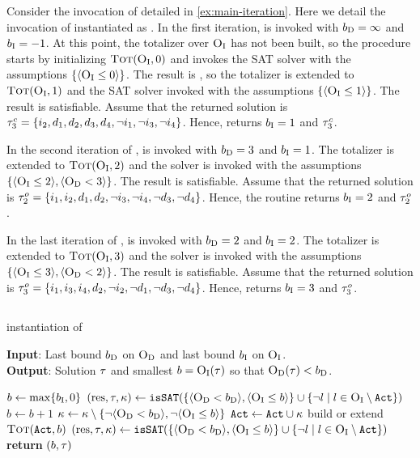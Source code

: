 \begin{example}
  Consider the invocation of \algname{} detailed in \cref{ex:main-iteration}. 
  Here we detail the invocation of \Min{} instantiated as \unsatsat{}.
  In the first iteration, \unsatsat{} is invoked with $b_{\text{D}} = \infty$ and $b_{\text{I}}=-1$.
  At this point, the totalizer over $\textsc{O}_{\text{I}}$ has not been built, so the procedure starts by initializing $\textsc{Tot}(\textsc{O}_{\text{I}}, 0)$ and invokes the SAT solver with the assumptions $\{\langle \textsc{O}_{\text{I}} \leq 0 \rangle\}$.
  The result is \unsat{}, so the totalizer is extended to $\textsc{Tot}(\textsc{O}_{\text{I}}, 1)$ and the SAT solver invoked with the assumptions $\{ \langle \textsc{O}_{\text{I}} \leq 1 \rangle\}$.
  The result is satisfiable.
  Assume that the returned solution is $\tau^c_3 = \{i_2,\allowbreak d_1,\allowbreak d_2,\allowbreak d_3,\allowbreak d_4,\allowbreak \lnot i_1,\allowbreak \lnot i_3,\allowbreak \lnot i_4\}$.
  Hence, \unsatsat{} returns $b_{\text{I}} = 1$ and $\tau^c_3$.

  In the second iteration of \algname{}, \unsatsat{} is invoked with $b_{\text{D}} = 3$ and $b_{\text{I}} = 1$.
  The totalizer is extended to $\textsc{Tot}(\textsc{O}_{\text{I}}, 2)$ and the solver is invoked with the assumptions $\{\langle \textsc{O}_{\text{I}} \leq 2 \rangle, \langle \textsc{O}_{\text{D}} < 3 \rangle\}$.
  The result is satisfiable.
  Assume that the returned solution is $\tau^o_2 = \{i_1,\allowbreak i_2,\allowbreak d_1,\allowbreak d_2,\allowbreak \lnot i_3,\allowbreak \lnot i_4,\allowbreak \lnot d_3,\allowbreak \lnot d_4\}$.
  Hence, the routine returns $b_{\text{I}} = 2$ and $\tau^o_2$.
  
  In the last iteration of \algname{}, \unsatsat{} is invoked with $b_{\text{D}} = 2$ and $b_{\text{I}} = 2$.
  The totalizer is extended to $\textsc{Tot}(\textsc{O}_{\text{I}}, 3)$ and the solver is invoked with the assumptions $\{\langle \textsc{O}_{\text{I}} \leq 3 \rangle, \langle \textsc{O}_{\text{D}} < 2 \rangle\}$.
  The result is satisfiable.
  Assume that the returned solution is $\tau^o_3 = \{i_1,\allowbreak i_3,\allowbreak i_4,\allowbreak d_2,\allowbreak \lnot i_2,\allowbreak \lnot d_1,\allowbreak \lnot d_3,\allowbreak \lnot d_4\}$.
  Hence, \unsatsat{} returns $b_{\text{I}} = 3$ and $\tau^o_3$.
\end{example}

\subsection{\msu{}\label{sec:msu}}

\begin{algorithm}[t]
  \caption{\msu{} instantiation of \Min{}}\label{alg:msu}
  \textbf{Input}: Last bound $b_{\text{D}}$ on $\textsc{O}_{\text{D}}$ and last bound $b_{\text{I}}$ on $\textsc{O}_{\text{I}}$. \\
  \textbf{Output}: Solution $\tau$ and smallest $b=\textsc{O}_{\text{I}}(\tau)$ so that $\textsc{O}_{\text{D}}(\tau)<b_{\text{D}}$.

  \begin{algorithmic}[1]
    \STATE $b \gets \max\{b_{\text{I}},0\}$
    \STATE $(\text{res},\tau,\kappa) \gets \texttt{isSAT}(\{\langle \textsc{O}_{\text{D}} < b_{\text{D}} \rangle, \langle \textsc{O}_{\text{I}} \leq b \rangle\} \cup \{\lnot l \mid l \in \textsc{O}_{\text{I}} \setminus \texttt{Act}\})$ \label{ln:msu-firstquery}
    \WHILE{$\res = \unsat$}
      \STATE $b \gets b+1$ \label{ln:msu-inc}
      \STATE $\kappa \gets \kappa \setminus \{\lnot\langle \textsc{O}_{\text{D}} < b_{\text{D}} \rangle, \lnot\langle \textsc{O}_{\text{I}} \leq b \rangle\}$
      \STATE $\texttt{Act} \gets \texttt{Act} \cup \kappa$
      \STATE build or extend $\textsc{Tot}(\texttt{Act},b)$ \label{ln:msu-tot}
      \STATE $(\text{res},\tau,\kappa) \gets \texttt{isSAT}(\{\langle \textsc{O}_{\text{D}} < b_{\text{D}} \rangle, \langle \textsc{O}_{\text{I}} \leq b \rangle\} \cup \{\lnot l \mid l \in \textsc{O}_{\text{I}} \setminus \texttt{Act}\})$ \label{ln:msu-mainquery}
    \ENDWHILE
    \STATE \textbf{return} $(b,\tau)$
  \end{algorithmic}
\end{algorithm}


